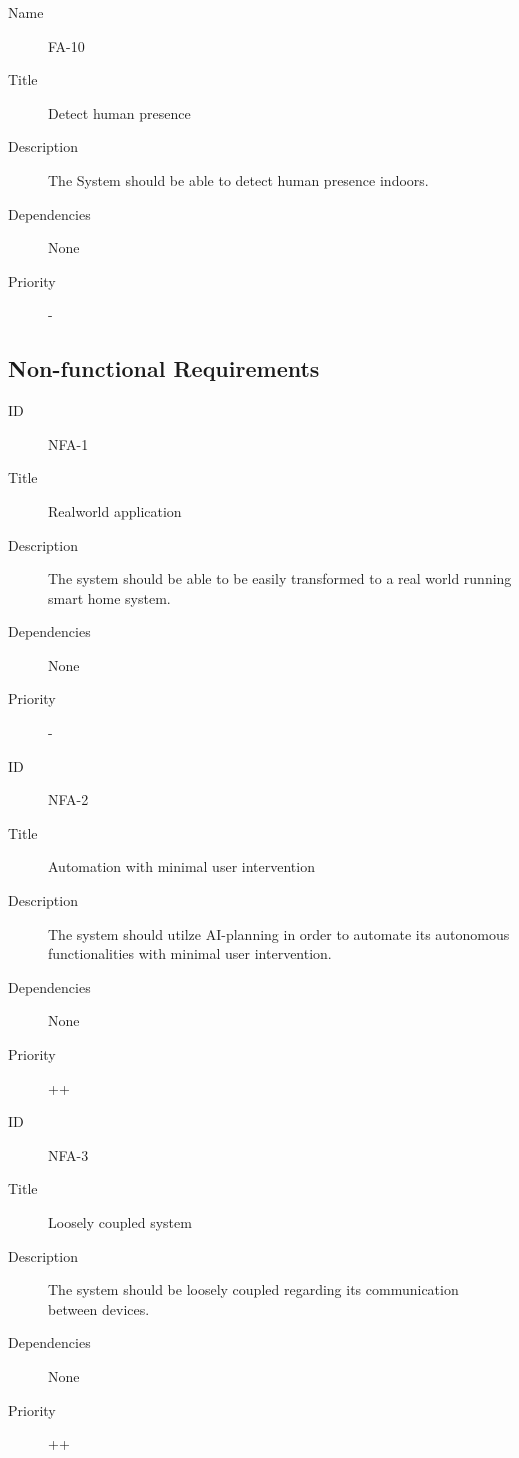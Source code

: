 \documentclass[runningheads]{llncs}
\begin{document}
    \begin{description}
        \item[Name] FA-10
        \item[Title] Detect human presence
        \item[Description] The System should be able to detect human presence indoors.
        \item[Dependencies] None
        \item[Priority] -
    \end{description}

    \subsection{Non-functional Requirements}

    \begin{description}
        \item[ID] NFA-1
        \item[Title] Realworld application
        \item[Description] The system should be able to be easily transformed to a real world running smart home system.
        \item[Dependencies] None
        \item[Priority] -
    \end{description}

    \begin{description}
        \item[ID] NFA-2
        \item[Title] Automation with minimal user intervention
        \item[Description] The system should utilze AI-planning in order to automate its autonomous functionalities with minimal user intervention.
        \item[Dependencies] None
        \item[Priority] ++
    \end{description}

    \begin{description}
        \item[ID] NFA-3
        \item[Title] Loosely coupled system
        \item[Description] The system should be loosely coupled regarding its communication between devices.
        \item[Dependencies] None
        \item[Priority] ++
    \end{description}
\end{document}
